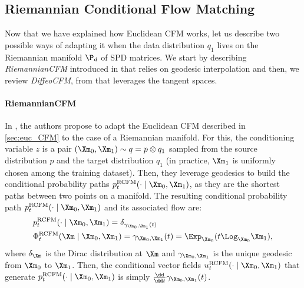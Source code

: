 \documentclass[10pt]{article} %
\theoremstyle{plain}
\theoremstyle{definition}
\theoremstyle{remark}
\begin{document}
\subsection{Riemannian Conditional Flow Matching}
\label{sec:riem_CFM}
Now that we have explained how Euclidean CFM works, let us describe two possible ways of adapting it when the data distribution $q_1$ lives on the Riemannian manifold $\P_d$ of SPD matrices. We start by describing \emph{RiemannianCFM} introduced in \citet{chen2024flow} that relies on geodesic interpolation and then, we review \emph{DiffeoCFM}, from \citet{collasRiemannianFlowMatching2025} that leverages the tangent spaces.
\paragraph{RiemannianCFM}
In \citet{chen2024flow}, the authors propose to adapt the Euclidean CFM described in \cref{sec:euc_CFM} to the case of a Riemannian manifold.
For this, the conditioning variable $z$ is a pair $(\Xm_0, \Xm_1) \sim q = p \otimes q_1$ sampled from the source distribution $p$ and the target distribution $q_1$ (in practice, $\Xm_1$ is uniformly chosen among the training dataset). Then, they leverage geodesics to build the conditional probability paths $p^{\text{RCFM}}_t(\cdot \mid \Xm_0, \Xm_1)$, as they are the shortest paths between two points on a manifold. The resulting conditional probability path $p^{\text{RCFM}}_t(\cdot \mid \Xm_0, \Xm_1)$ and its associated flow are:
\begin{equation}
  \begin{aligned}
    &p^{\text{RCFM}}_t(\cdot \mid \Xm_0, \Xm_1) = \delta_{\gamma_{\Xm_0,\Xm_1}(t)} \\
    &\Phi^{\text{RCFM}}_t(\Xm\mid \Xm_0, \Xm_1) = \gamma_{\Xm_0,\Xm_1}(t) = \Exp_{\Xm_0}(t\Log_{\Xm_0}\Xm_1),
  \end{aligned}
\end{equation}
where $\delta_{\Xm}$ is the Dirac distribution at $\Xm$ and $\gamma_{\Xm_0,\Xm_1}$ is the unique geodesic from $\Xm_0$ to $\Xm_1$. Then, the conditional vector fields $u^{\text{RCFM}}_t(\cdot \mid \Xm_0,\Xm_1)$ that generate $p^{\text{RCFM}}_t(\cdot \mid \Xm_0, \Xm_1)$ is simply $\frac{\dd}{\dd t} \gamma_{\Xm_0,\Xm_1}(t)$.
\end{document}
